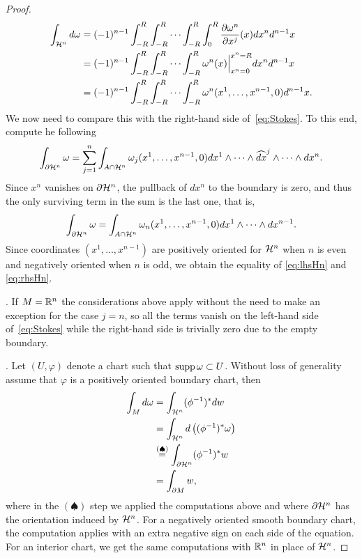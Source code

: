 \begin{proof}
\begin{align}
    \int_{\cH^n} d\omega
    &=(-1)^{n-1} \int_{-R}^R\int_{-R}^R\cdots\int_{-R}^R\int_{0}^{R}\frac{\partial \omega^n}{\partial x^j}(x) dx^n d^{n-1} x \\ %
    &=(-1)^{n-1} \int_{-R}^R\int_{-R}^R\cdots\int_{-R}^R \omega^n(x)\Big|_{x^n=0}^{x^n=R} dx^n d^{n-1} x \\ %
    &=(-1)^{n-1} \int_{-R}^R\int_{-R}^R\cdots\int_{-R}^R \omega^n(x^1, \ldots, x^{n-1}, 0) d^{n-1} x %
    .\label{eq:lhsHn}
  \end{align}
  We now need to compare this with the right-hand side of~\eqref{eq:Stokes}.
  To this end, compute he following
  \begin{equation}
    \int_{\partial \mathcal{H}^n}\omega = \sum_{j=1}^n \int_{A\cap\mathcal{H}^n} \omega_j(x^1, \ldots, x^{n-1}, 0) dx^1 \wedge \cdots\wedge \widehat{dx}^j \wedge \cdots\wedge dx^n.
  \end{equation}
  Since $x^n$ vanishes on $\partial\mathcal{H}^n$, the pullback of $dx^n$ to the boundary is zero, and thus the only surviving term in the sum is the last one, that is,
  \begin{equation}\label{eq:rhsHn}
    \int_{\partial \mathcal{H}^n}\omega = \int_{A\cap\mathcal{H}^n} \omega_n(x^1, \ldots, x^{n-1}, 0) dx^1 \wedge\cdots\wedge dx^{n-1}.
  \end{equation}
  Since coordinates $(x^1, \ldots, x^{n-1})$ are positively oriented for $\mathcal{H}^n$ when $n$ is even and negatively oriented when $n$ is odd, we obtain the equality of \eqref{eq:lhsHn} and \eqref{eq:rhsHn}.

  .
  If $M=\mathbb{R}^n$ the considerations above apply without the need to make an exception for the case $j=n$, so all the terms vanish on the left-hand side of~\eqref{eq:Stokes} while the right-hand side is trivially zero due to the empty boundary.

  .
  Let $(U,\varphi)$ denote a chart such that $\operatorname{supp} \omega \subset U$.
  Without loss of generality assume that $\varphi$ is a positively oriented boundary chart, then
  \begin{align}
    \int_M d\omega
    &= \int_{\mathcal{H}^n}(\phi^{-1})^* dw \\
    &= \int_{\mathcal{H}^n} d\left((\phi^{-1})^* \omega\right) \\
    &\overset{(\spadesuit)}{=} \int_{\partial \mathcal{H}^n}(\phi^{-1})^* w \\
    &= \int_{\partial M} w , 
  \end{align}
  where in the $(\spadesuit)$ step we applied the computations above and where $\partial \mathcal{H}^n$ has the orientation induced by $\mathcal{H}^n$.
  For a negatively oriented smooth boundary chart, the computation applies with an extra negative sign on each side of the equation.
  For an interior chart, we get the same computations with $\mathbb{R}^n$ in place of $\mathcal{H}^n$.


\end{proof}
